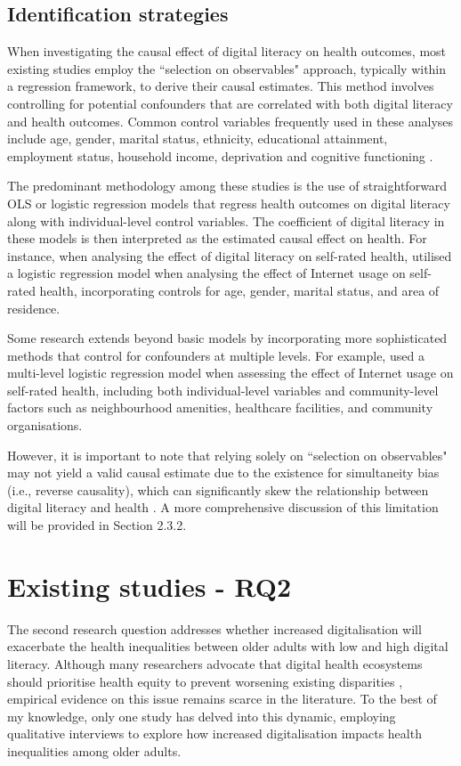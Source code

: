 \subsection{Identification strategies}
When investigating the causal effect of digital literacy on health outcomes, most existing studies employ the ``selection on observables" approach, typically within a regression framework, to derive their causal estimates. This method involves controlling for potential confounders that are correlated with both digital literacy and health outcomes. Common control variables frequently used in these analyses include age, gender, marital status, ethnicity, educational attainment, employment status, household income, deprivation and cognitive functioning \parencite{hall_digital_2015,he_factors_2022,mitchell_digital_2019,mcdonald_insights_2004}.

The predominant methodology among these studies is the use of straightforward OLS or logistic regression models that regress health outcomes on digital literacy along with individual-level control variables. The coefficient of digital literacy in these models is then interpreted as the estimated causal effect on health. For instance, when analysing the effect of digital literacy on self-rated health, \textcite{gracia_internet_2009} utilised a logistic regression model when analysing the effect of Internet usage on self-rated health, incorporating controls for age, gender, marital status, and area of residence. 

Some research extends beyond basic models by incorporating more sophisticated methods that control for confounders at multiple levels. For example, \textcite{hong_digital_2017} used a multi-level logistic regression model when assessing the effect of Internet usage on self-rated health, including both individual-level variables and community-level factors such as neighbourhood amenities, healthcare facilities, and community organisations. 

However, it is important to note that relying solely on ``selection on observables" may not yield a valid causal estimate due to the existence for simultaneity bias (i.e., reverse causality), which can significantly skew the relationship between digital literacy and health \parencite{czaja_factors_2013,drentea_association_2008,greer_digital_2019}. A more comprehensive discussion of this limitation will be provided in Section 2.3.2.

\section{Existing studies - RQ2}
The second research question addresses whether increased digitalisation will exacerbate the health inequalities between older adults with low and high digital literacy. Although many researchers advocate that digital health ecosystems should prioritise health equity to prevent worsening existing disparities \parencite{eyrich_bridging_2021,vankessel_digital_2022a}, empirical evidence on this issue remains scarce in the literature. To the best of my knowledge, only one study has delved into this dynamic, employing qualitative interviews to explore how increased digitalisation impacts health inequalities among older adults.

